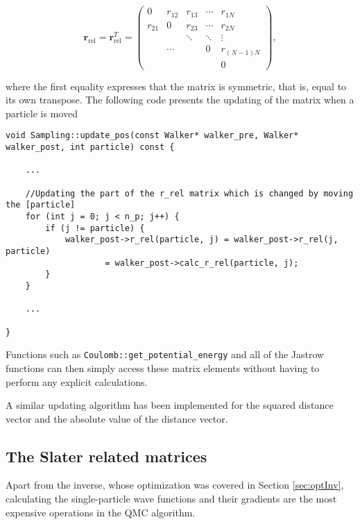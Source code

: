 \begin{equation}
\mathbf{r}_\mathrm{rel} = \mathbf{r}_\mathrm{rel}^T = \left( \begin{array}{ccccc}
0 & r_{12} & r_{13} & \cdots & r_{1N} \\
r_{21} & 0 & r_{23} & \cdots & r_{2N}  \\
 &  & \ddots & \ddots & \vdots \\
 & \cdots &  & 0 & r_{(N-1)N} \\
 &  &  &  & 0\end{array} \right),
\end{equation}

where the first equality expresses that the matrix is symmetric, that is, equal to its own transpose. The following code presents the updating of the matrix when a particle is moved

\vspace{0.25cm}
\begin{lstlisting}[caption={The code used to update the relative distance matrix of a walker when a particle is moved. In line 8, the symmetry of the matrix is exploited to further decrease the number of calls to the relative distance function in line 9.}]
void Sampling::update_pos(const Walker* walker_pre, Walker* walker_post, int particle) const {

    ...

    //Updating the part of the r_rel matrix which is changed by moving the [particle]
    for (int j = 0; j < n_p; j++) {
        if (j != particle) {
            walker_post->r_rel(particle, j) = walker_post->r_rel(j, particle)
                    = walker_post->calc_r_rel(particle, j);
        }
    }
    
    ...

}
\end{lstlisting}


Functions such as \verb+Coulomb::get_potential_energy+ and all of the Jastrow functions can then simply access these matrix elements without having to perform any explicit calculations.

A similar updating algorithm has been implemented for the squared distance vector and the absolute value of the distance vector. 

\subsection{The Slater related matrices}
\label{sec:storeSlater}

Apart from the inverse, whose optimization was covered in Section \ref{sec:optInv}, calculating the single-particle wave functions and their gradients are the most expensive operations in the QMC algorithm.


